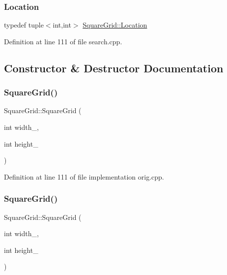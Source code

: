 \subsubsection{\texorpdfstring{Location}{Location}\hspace{0.1cm}{\footnotesize\ttfamily [2/2]}}
{\footnotesize\ttfamily typedef tuple$<$int,int$>$ \hyperlink{struct_square_grid_a2c9a2cbd3912aa48ac97289abc3f1c0f}{Square\+Grid\+::\+Location}}



Definition at line 111 of file search.\+cpp.



\subsection{Constructor \& Destructor Documentation}
\mbox{\label{struct_square_grid_ae5debd1459b89aba9497f270f6d76d7b}} 
\subsubsection{\texorpdfstring{Square\+Grid()}{SquareGrid()}\hspace{0.1cm}{\footnotesize\ttfamily [1/2]}}
{\footnotesize\ttfamily Square\+Grid\+::\+Square\+Grid (\begin{DoxyParamCaption}\item[{int}]{width\+\_\+,  }\item[{int}]{height\+\_\+ }\end{DoxyParamCaption})\hspace{0.3cm}{\ttfamily [inline]}}



Definition at line 111 of file implementation orig.\+cpp.

\mbox{\label{struct_square_grid_ae5debd1459b89aba9497f270f6d76d7b}} 
\subsubsection{\texorpdfstring{Square\+Grid()}{SquareGrid()}\hspace{0.1cm}{\footnotesize\ttfamily [2/2]}}
{\footnotesize\ttfamily Square\+Grid\+::\+Square\+Grid (\begin{DoxyParamCaption}\item[{int}]{width\+\_\+,  }\item[{int}]{height\+\_\+ }\end{DoxyParamCaption})\hspace{0.3cm}{\ttfamily [inline]}}



